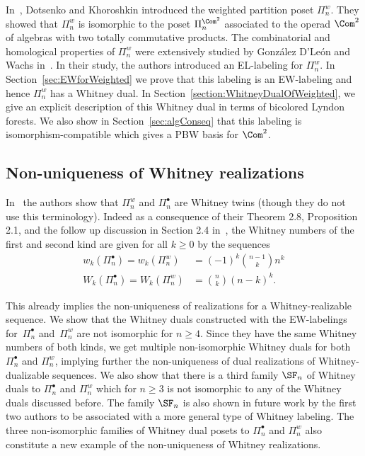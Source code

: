   In~\cite{DotsenkoKhoroshkin2007}, Dotsenko and Khoroshkin introduced the weighted partition poset $\Pi_n^w$. They  showed that $\Pi_n^w$ is isomorphic to the poset $\Pi_n^{\Com^2}$ associated to the operad $\Com^2$ of algebras with two totally commutative products.  The combinatorial and homological properties of $\Pi_n^w$ were extensively studied by Gonz\'alez D'Le\'on and Wachs in~\cite{GonzalezDleonWachs2016}. In their study, the authors introduced an EL-labeling for $\Pi_n^w$. In Section~\ref{sec:EWforWeighted} we prove that this labeling is an EW-labeling and hence $\Pi_n^w$ has a Whitney dual.   In Section~\ref{section:WhitneyDualOfWeighted}, we give an explicit description of this Whitney dual in terms of bicolored Lyndon forests.  We also show in Section~\ref{sec:algConseq} that this labeling is isomorphism-compatible which gives a PBW basis for $\Com^2$.
  
  \subsection{Non-uniqueness of Whitney realizations}
  In~\cite[Section 2.4]{GonzalezDleonWachs2016} the authors show that $\Pi_n^w$ and $\Pi_n^{\bullet}$ are Whitney twins (though they do not use this terminology). Indeed as a consequence of their Theorem 2.8, Proposition 2.1, and the follow up discussion in Section 2.4 in~\cite{GonzalezDleonWachs2016},  the Whitney numbers of the first and second kind are given for all $k\ge 0$ by the sequences
  \begin{align*}
w_k(\Pi_n^{\bullet})=w_k(\Pi_n^{w})&=(-1)^{k}\binom{n-1}{k}n^{k}\\
W_k(\Pi_n^{\bullet})=W_k(\Pi_n^{w})&=\binom{n}{k}(n-k)^{k}.
  \end{align*}

  
  
  
  This already implies the non-uniqueness of realizations for a Whitney-realizable sequence. We show that the Whitney duals constructed with the EW-labelings for~$\Pi_n^\bullet$ and~$\Pi_n^w$ are not isomorphic for $n\geq 4$.  Since they have the same Whitney numbers of both kinds, we get multiple non-isomorphic Whitney duals for both $\Pi_n^\bullet$ and $\Pi_n^w$, implying further the non-uniqueness of dual realizations of Whitney-dualizable sequences. We also show that there is a third family $\SF_n$ of Whitney duals to $\Pi_n^\bullet$ and $\Pi_n^w$ which for $n\ge 3$ is not isomorphic to any of the Whitney duals discussed before. The family  $\SF_n$ is also shown in future work by the first two authors to be associated with a more general type of Whitney labeling. The three non-isomorphic families of Whitney dual posets to $\Pi_n^\bullet$ and $\Pi_n^w$ also constitute a new example of the non-uniqueness of Whitney realizations.

